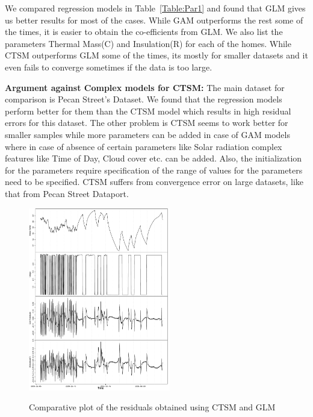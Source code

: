 \documentclass{sig-alternate}
\begin{document}
 \indent We compared regression models in Table~\ref{Table:Par1} and found that GLM gives us better results for most of the cases. While GAM outperforms the rest some of the times, it is easier to obtain the co-efficients from GLM. We also list the parameters Thermal Mass(C) and Insulation(R) for each of the homes. While CTSM outperforms GLM some of the times, its mostly for smaller datasets and it even fails to converge sometimes if the data is too large.  

  
\indent \textbf{Argument against Complex models for CTSM:} The main dataset for comparison is Pecan Street's Dataset. We found that the regression models perform better for them than the CTSM model which results in high residual errors for this dataset. The other problem is CTSM seems to work better for smaller samples while more parameters can be added in case of GAM models where in case of absence of certain parameters like Solar radiation complex features like Time of Day, Cloud cover etc. can be added.  Also, the initialization for the parameters require specification of the range of values for the parameters need to be specified. CTSM suffers from convergence error on large datasets, like that from Pecan Street Dataport.
  \begin{figure}[h]
\includegraphics[height = 8cm,width=.48\textwidth]{RplotResiduals}
\label{img:resid}
\caption{Comparative plot of the residuals obtained using CTSM and GLM}
\end{figure}
  
\end{document}
